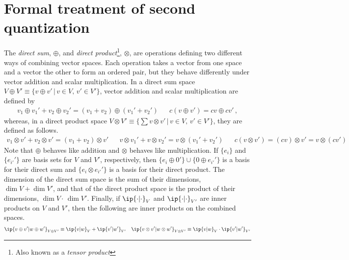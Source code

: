\section{Formal treatment of second quantization}

\begin{dfn}\label{dfn:direct-sum-and-direct-product}
\begin{samepage}
The \textit{direct sum}, $\oplus$, and \textit{direct product}\footnote{Also known as a \textit{tensor product}}, $\otimes$, are operations defining two different ways of combining vector spaces.
Each operation takes a vector from one space and a vector the other to form an ordered pair, but they behave differently under vector addition and scalar multiplication.
In a direct sum space $V\oplus V'\equiv\{v\oplus v'\,|\,v\in V,\,v'\in V'\}$,
vector addition and scalar multiplication are defined by
\begin{align}
  v_1\oplus v_1'
+
  v_2\oplus v_2'
=
  (v_1 + v_2)
\oplus
  (v_1' + v_2')
&&
  c(v\oplus v')
=
  cv\oplus cv'\,,
\end{align}
whereas, in a direct product space $V\otimes V'\equiv\{\sum v\otimes v'\,|\,v\in V,\,v'\in V'\}$, they are defined as follows.
\begin{align}
  v_1\otimes v'
+
  v_2\otimes v'
=
  (v_1 + v_2)\otimes v'
&&
  v\otimes v_1'
+
  v\otimes v_2'
=
  v\otimes(v_1' + v_2')
&&
  c(v\otimes v')
=
  (cv)\otimes v'
=
  v\otimes(cv')
\end{align}
Note that $\oplus$ behaves like addition and $\otimes$ behaves like multiplication.
If $\{e_i\}$ and $\{e_{i'}'\}$ are basis sets for $V$ and $V'$, respectively, then $\{e_i\oplus0'\}\cup\{0\oplus e_{i'}'\}$ is a basis for their direct sum and $\{e_i\otimes e_{i'}'\}$ is a basis for their direct product.
The dimension of the direct sum space is the sum of their dimensions,
$\dim V+\dim V'$,
and that of the direct product space is the product of their dimensions,
$\dim V\cdot \,\dim V'$.
Finally, if $\ip{\cdot|\cdot}_V$ and $\ip{\cdot|\cdot}_{V'}$ are inner products on $V$ and $V'$, then the following are inner products on the combined spaces.
\begin{align}
  \ip{v\oplus v'|w\oplus w'}_{V\oplus V'}
\equiv
  \ip{v|w}_V
+
  \ip{v'|w'}_{V'}
&&
  \ip{v\otimes v'|w\otimes w'}_{V\otimes V'}
\equiv
  \ip{v|w}_V
\cdot
  \ip{v'|w'}_{V'}
\end{align}
\end{samepage}
\end{dfn}


